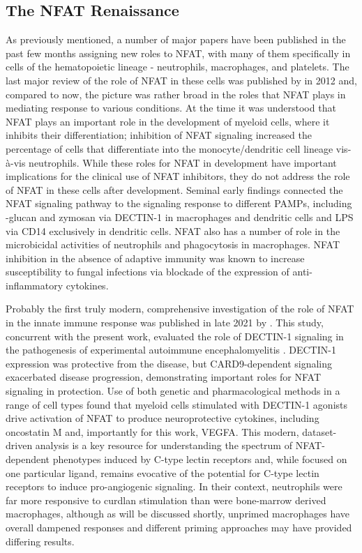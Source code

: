 \subsection{The NFAT Renaissance}\label{nouveaunfat}

As previously mentioned, a number of major papers have been published in the past few months assigning new roles to NFAT, with many of them specifically in cells of the hematopoietic lineage - neutrophils, macrophages, and platelets. The last major review of the role of NFAT in these cells was published by \citeauthor{Fric2012} in 2012 and, compared to now, the picture was rather broad in the roles that NFAT plays in mediating response to various conditions. At the time it was understood that NFAT plays an important role in the development of myeloid cells, where it inhibits their differentiation; inhibition of NFAT signaling increased the percentage of cells that differentiate into the monocyte/dendritic cell lineage vis-\`{a}-vis neutrophils. While these roles for NFAT in development have important implications for the clinical use of NFAT inhibitors, they do not address the role of NFAT in these cells after development. Seminal early findings connected the NFAT signaling pathway to the signaling response to different PAMPs, including \textbeta-glucan and zymosan via DECTIN-1 in macrophages and dendritic cells and LPS via CD14 exclusively in dendritic cells. NFAT also has a number of role in the microbicidal activities of neutrophils and phagocytosis in macrophages. NFAT inhibition in the absence of adaptive immunity was known to increase susceptibility to fungal infections via blockade of the expression of anti-inflammatory cytokines. 

Probably the first truly modern, comprehensive investigation of the role of NFAT in the innate immune response was published in late 2021 by \citeauthor{Deerhake2021}. This study, concurrent with the present work, evaluated the role of DECTIN-1 signaling in the pathogenesis of experimental autoimmune encephalomyelitis \citep{Deerhake2021}. DECTIN-1 expression was protective from the disease, but CARD9-dependent signaling exacerbated disease progression, demonstrating important roles for NFAT signaling in protection. Use of both genetic and pharmacological methods in a range of cell types found that myeloid cells stimulated with DECTIN-1 agonists drive activation of NFAT to produce neuroprotective cytokines, including oncostatin M and, importantly for this work, VEGFA. This modern, dataset-driven analysis is a key resource for understanding the spectrum of NFAT-dependent phenotypes induced by C-type lectin receptors and, while focused on one particular ligand, remains evocative of the potential for C-type lectin receptors to induce pro-angiogenic signaling. In their context, neutrophils were far more responsive to curdlan stimulation than were bone-marrow derived macrophages, although as will be discussed shortly, unprimed macrophages have overall dampened responses and different priming approaches may have provided differing results.

